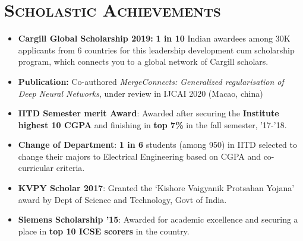 \documentclass{article}
\newcommand{\tmpsection}[1]{}
\let\tmpsection=\section
\renewcommand{\section}[1]{\tmpsection*{\textsc{#1}}}
\begin{document}
\section{Scholastic Achievements}
\begin{itemize}
    \setlength\itemsep{0.0em}
    
    \item \textbf{Cargill Global Scholarship 2019:} \textbf{1 in 10} Indian awardees among 30K applicants from 6 countries for this leadership development cum scholarship program, which connects you to a global network of Cargill scholars.
    
    \item \textbf{Publication:} Co-authored \textit{MergeConnects: Generalized regularisation of Deep Neural Networks}, under review in IJCAI 2020 (Macao, china)
 
    \item \textbf{IITD Semester merit Award}: Awarded after securing the \textbf{Institute highest 10 CGPA} and finishing in \textbf{top 7\%} in the fall semester, '17-'18.
    
    
   \item \textbf{Change of Department}: \textbf{1 in 6} students (among 950) in IITD selected to change their majors to Electrical Engineering based on CGPA and co-curricular criteria. 
   
    \item \textbf{KVPY Scholar 2017}: Granted the `Kishore Vaigyanik Protsahan Yojana' award by Dept of Science and Technology, Govt of India.

    \item \textbf{Siemens Scholarship '15}: Awarded for academic excellence and securing a place in \textbf{top 10 ICSE scorers} in the country.
    
   
    
    
\end{itemize}
\end{document}
